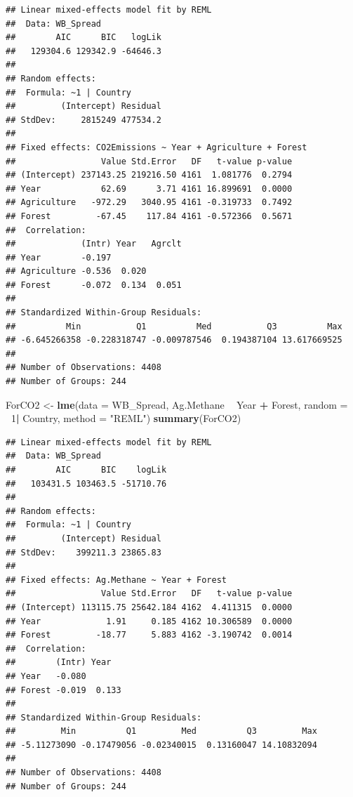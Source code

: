 \documentclass[12pt,]{article}
\newenvironment{Shaded}{\begin{snugshade}}{\end{snugshade}}
\newcommand{\KeywordTok}[1]{\textcolor[rgb]{0.13,0.29,0.53}{\textbf{#1}}}
\newcommand{\DataTypeTok}[1]{\textcolor[rgb]{0.13,0.29,0.53}{#1}}
\newcommand{\DecValTok}[1]{\textcolor[rgb]{0.00,0.00,0.81}{#1}}
\newcommand{\StringTok}[1]{\textcolor[rgb]{0.31,0.60,0.02}{#1}}
\newcommand{\OperatorTok}[1]{\textcolor[rgb]{0.81,0.36,0.00}{\textbf{#1}}}
\newcommand{\NormalTok}[1]{#1}
\begin{document}
\begin{verbatim}
## Linear mixed-effects model fit by REML
##  Data: WB_Spread 
##        AIC      BIC   logLik
##   129304.6 129342.9 -64646.3
## 
## Random effects:
##  Formula: ~1 | Country
##         (Intercept) Residual
## StdDev:     2815249 477534.2
## 
## Fixed effects: CO2Emissions ~ Year + Agriculture + Forest 
##                 Value Std.Error   DF   t-value p-value
## (Intercept) 237143.25 219216.50 4161  1.081776  0.2794
## Year            62.69      3.71 4161 16.899691  0.0000
## Agriculture   -972.29   3040.95 4161 -0.319733  0.7492
## Forest         -67.45    117.84 4161 -0.572366  0.5671
##  Correlation: 
##             (Intr) Year   Agrclt
## Year        -0.197              
## Agriculture -0.536  0.020       
## Forest      -0.072  0.134  0.051
## 
## Standardized Within-Group Residuals:
##          Min           Q1          Med           Q3          Max 
## -6.645266358 -0.228318747 -0.009787546  0.194387104 13.617669525 
## 
## Number of Observations: 4408
## Number of Groups: 244
\end{verbatim}

\begin{Shaded}
\begin{Highlighting}[]
\NormalTok{ForCO2 <-}\StringTok{ }\KeywordTok{lme}\NormalTok{(}\DataTypeTok{data =}\NormalTok{ WB_Spread,}
\NormalTok{                 Ag.Methane }\OperatorTok{~}\StringTok{ }\NormalTok{Year }\OperatorTok{+}\StringTok{ }\NormalTok{Forest,}
                 \DataTypeTok{random =} \OperatorTok{~}\DecValTok{1}\OperatorTok{|}\StringTok{ }\NormalTok{Country,}
                 \DataTypeTok{method =} \StringTok{"REML"}\NormalTok{)}
\KeywordTok{summary}\NormalTok{(ForCO2)}
\end{Highlighting}
\end{Shaded}

\begin{verbatim}
## Linear mixed-effects model fit by REML
##  Data: WB_Spread 
##        AIC      BIC    logLik
##   103431.5 103463.5 -51710.76
## 
## Random effects:
##  Formula: ~1 | Country
##         (Intercept) Residual
## StdDev:    399211.3 23865.83
## 
## Fixed effects: Ag.Methane ~ Year + Forest 
##                 Value Std.Error   DF   t-value p-value
## (Intercept) 113115.75 25642.184 4162  4.411315  0.0000
## Year             1.91     0.185 4162 10.306589  0.0000
## Forest         -18.77     5.883 4162 -3.190742  0.0014
##  Correlation: 
##        (Intr) Year  
## Year   -0.080       
## Forest -0.019  0.133
## 
## Standardized Within-Group Residuals:
##         Min          Q1         Med          Q3         Max 
## -5.11273090 -0.17479056 -0.02340015  0.13160047 14.10832094 
## 
## Number of Observations: 4408
## Number of Groups: 244
\end{verbatim}
\end{document}
